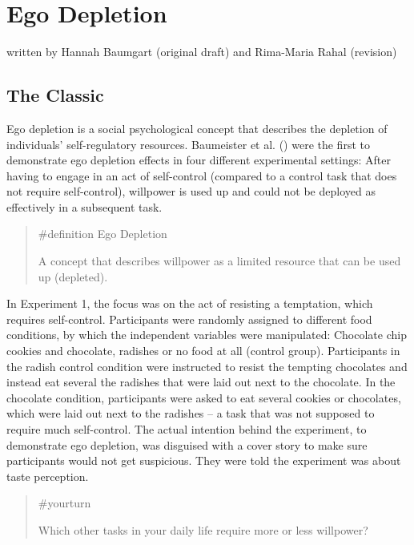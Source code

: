\documentclass[
  letterpaper,
]{book}
\begin{document}

\chapter{\texorpdfstring{{Ego
Depletion}}{Ego Depletion}}\label{ego-depletion}

{written by Hannah Baumgart (original draft) and Rima-Maria Rahal
(revision)}

\section{The Classic}\label{the-classic}

Ego depletion is a social psychological concept that describes the
depletion of individuals' self-regulatory resources. Baumeister et al.
() were the first to demonstrate ego
depletion effects in four different experimental settings: After having
to engage in an act of self-control (compared to a control task that
does not require self-control), willpower is used up and could not be
deployed as effectively in a subsequent task.

\begin{quote}
\label{def-egodepletion}{\#definition} Ego Depletion

A concept that describes willpower as a limited resource that can be
used up (depleted).
\end{quote}

In Experiment 1, the focus was on the act of resisting a temptation,
which requires self-control. Participants were randomly assigned to
different food conditions, by which the independent variables were
manipulated: Chocolate chip cookies and chocolate, radishes or no food
at all (control group). Participants in the radish control condition
were instructed to resist the tempting chocolates and instead eat
several the radishes that were laid out next to the chocolate. In the
chocolate condition, participants were asked to eat several cookies or
chocolates, which were laid out next to the radishes -- a task that was
not supposed to require much self-control. The actual intention behind
the experiment, to demonstrate ego depletion, was disguised with a cover
story to make sure participants would not get suspicious. They were told
the experiment was about taste perception.

\begin{quote}
{\#yourturn}

Which other tasks in your daily life require more or less willpower?
\end{quote}
\end{document}
